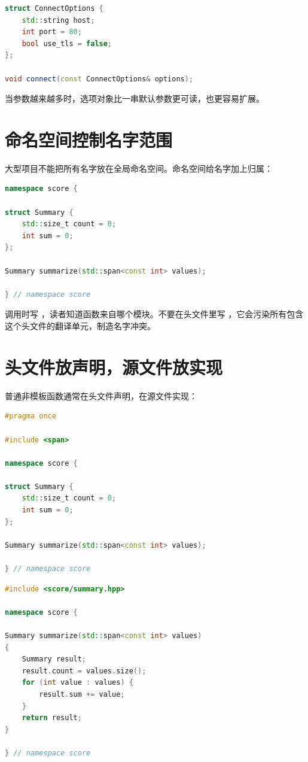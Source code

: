 \begin{lstlisting}[language=C++,caption={用选项对象表达默认值}]
struct ConnectOptions {
    std::string host;
    int port = 80;
    bool use_tls = false;
};

void connect(const ConnectOptions& options);
\end{lstlisting}

当参数越来越多时，选项对象比一串默认参数更可读，也更容易扩展。

\section{命名空间控制名字范围}

大型项目不能把所有名字放在全局命名空间。命名空间给名字加上归属：

\begin{lstlisting}[language=C++,caption={命名空间组织模块}]
namespace score {

struct Summary {
    std::size_t count = 0;
    int sum = 0;
};

Summary summarize(std::span<const int> values);

} // namespace score
\end{lstlisting}

调用时写 ，读者知道函数来自哪个模块。不要在头文件里写 ，它会污染所有包含这个头文件的翻译单元，制造名字冲突。

\section{头文件放声明，源文件放实现}

普通非模板函数通常在头文件声明，在源文件实现：

\begin{lstlisting}[language=C++,caption={summary.hpp}]
#pragma once

#include <span>

namespace score {

struct Summary {
    std::size_t count = 0;
    int sum = 0;
};

Summary summarize(std::span<const int> values);

} // namespace score
\end{lstlisting}

\begin{lstlisting}[language=C++,caption={summary.cpp}]
#include <score/summary.hpp>

namespace score {

Summary summarize(std::span<const int> values)
{
    Summary result;
    result.count = values.size();
    for (int value : values) {
        result.sum += value;
    }
    return result;
}

} // namespace score
\end{lstlisting}


